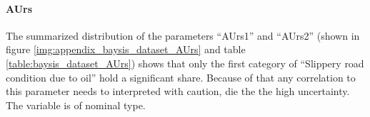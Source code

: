 \documentclass[a4paper,headsepline,footsepline,fontsize=11pt,BCOR=12mm,DIV=12]{report}
\begin{document}
\paragraph{AUrs}
The summarized distribution of the parameters “AUrs1” and “AUrs2” (shown in figure \ref{img:appendix_baysis_dataset_AUrs} and table \ref{table:baysis_dataset_AUrs}) shows that only the first category of “Slippery road condition due to oil” hold a significant share. Because of that any correlation to this parameter needs to interpreted with caution, die the the high uncertainty. The variable is of nominal type. 
\end{document}
